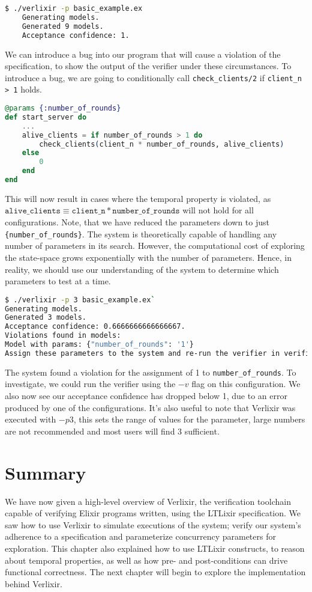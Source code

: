 \begin{lstlisting}[language=bash, xleftmargin=.1\linewidth]
    $ ./verlixir -p basic_example.ex 
    Generating models.
    Generated 9 models.
    Acceptance confidence: 1.
\end{lstlisting}
We can introduce a bug into our program that will cause a violation of the specification, to show the output of the verifier under these circumstances. To introduce a bug, we are going to conditionally call \texttt{check\_clients/2} if \texttt{client\_n > 1} holds.
\begin{lstlisting}[language=Elixir, xleftmargin=.1\linewidth]
@params {:number_of_rounds}
def start_server do
    ...
    alive_clients = if number_of_rounds > 1 do
        check_clients(client_n * number_of_rounds, alive_clients)
    else
        0
    end
end
\end{lstlisting}
This will now result in cases where the temporal property is violated, as $\texttt{alive\_clients} \equiv \texttt{client\_n} * \texttt{number\_of\_rounds}$ will not hold for all configurations. Note, that we have reduced the parameters down to just \texttt{\{number\_of\_rounds\}}. The system is theoretically capable of handling any number of parameters in its search. However, the computational cost of exploring the state-space grows exponentially with the number of parameters. Hence, in reality, we should use our understanding of the system to determine which parameters to test at a time.
\begin{lstlisting}[language=bash, xleftmargin=.1\linewidth]
$ ./verlixir -p 3 basic_example.ex`
Generating models.
Generated 3 models.
Acceptance confidence: 0.6666666666666667.
Violations found in models:
Model with params: {"number_of_rounds": '1'}
Assign these parameters to the system and re-run the verifier in verification mode to gather a trace.
\end{lstlisting}
The system found a violation for the assignment of 1 to \texttt{number\_of\_rounds}. To investigate, we could run the verifier using the $-v$ flag on this configuration. We also now see our acceptance confidence has dropped below 1, due to an error produced by one of the configurations. It's also useful to note that Verlixir was executed with $-p 3$, this sets the range of values for the parameter, large numbers are not recommended and most users will find 3 sufficient. 
\section{Summary}
We have now given a high-level overview of Verlixir, the verification toolchain capable of verifying Elixir programs written, using the LTLixir specification. We saw how to use Verlixir to simulate executions of the system; verify our system's adherence to a specification and parameterize concurrency parameters for exploration. This chapter also explained how to use LTLixir constructs, to reason about temporal properties, as well as how pre- and post-conditions can drive functional correctness. The next chapter will begin to explore the implementation behind Verlixir.